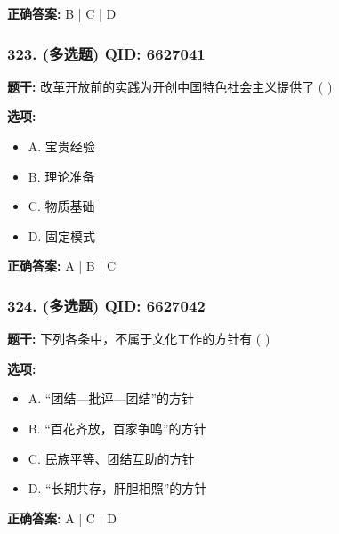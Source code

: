 \documentclass[12pt,UTF8]{ctexart}
\begin{document}
\textbf{正确答案:}
B | C | D

\vspace{0.3em}\hrulefill\vspace{0.7em}

\subsubsection*{323. (多选题) \small QID: 6627041}

\textbf{题干:}
改革开放前的实践为开创中国特色社会主义提供了  ( )

\textbf{选项:}
\begin{itemize}[leftmargin=*]

  \item A. 宝贵经验

  \item B. 理论准备

  \item C. 物质基础

  \item D. 固定模式

\end{itemize}

\textbf{正确答案:}
A | B | C

\vspace{0.3em}\hrulefill\vspace{0.7em}

\subsubsection*{324. (多选题) \small QID: 6627042}

\textbf{题干:}
下列各条中，不属于文化工作的方针有  ( )

\textbf{选项:}
\begin{itemize}[leftmargin=*]

  \item A. “团结—批评—团结”的方针

  \item B. “百花齐放，百家争鸣”的方针

  \item C. 民族平等、团结互助的方针

  \item D. “长期共存，肝胆相照”的方针

\end{itemize}

\textbf{正确答案:}
A | C | D

\vspace{0.3em}\hrulefill\vspace{0.7em}
\end{document}
